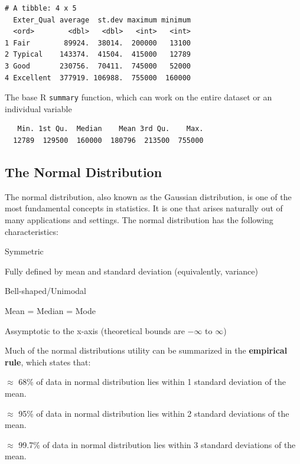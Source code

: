 \documentclass[
  letterpaper,
  DIV=11,
  numbers=noendperiod]{scrreprt}
\newenvironment{Shaded}{\begin{snugshade}}{\end{snugshade}}
\newcommand{\FunctionTok}[1]{\textcolor[rgb]{0.28,0.35,0.67}{#1}}
\newcommand{\NormalTok}[1]{\textcolor[rgb]{0.00,0.23,0.31}{#1}}
\newcommand{\SpecialCharTok}[1]{\textcolor[rgb]{0.37,0.37,0.37}{#1}}
\begin{document}
\begin{verbatim}
# A tibble: 4 x 5
  Exter_Qual average  st.dev maximum minimum
  <ord>        <dbl>   <dbl>   <int>   <int>
1 Fair        89924.  38014.  200000   13100
2 Typical    143374.  41504.  415000   12789
3 Good       230756.  70411.  745000   52000
4 Excellent  377919. 106988.  755000  160000
\end{verbatim}

The base R \texttt{summary} function, which can work on the entire
dataset or an individual variable

\begin{Shaded}
\end{Shaded}

\begin{verbatim}
   Min. 1st Qu.  Median    Mean 3rd Qu.    Max. 
  12789  129500  160000  180796  213500  755000 
\end{verbatim}

\hypertarget{normal}{%
\subsection{The Normal Distribution}\label{normal}}

The normal distribution, also known as the Gaussian distribution, is one
of the most fundamental concepts in statistics. It is one that arises
naturally out of many applications and settings. The normal distribution
has the following characteristics:

Symmetric

Fully defined by mean and standard deviation (equivalently, variance)

Bell-shaped/Unimodal

Mean = Median = Mode

Assymptotic to the x-axis (theoretical bounds are \(-\infty\) to
\(\infty\))

Much of the normal distributions utility can be summarized in the
\textbf{empirical rule}, which states that:

\(\approx\) 68\% of data in normal distribution lies within 1 standard
deviation of the mean.

\(\approx\) 95\% of data in normal distribution lies within 2 standard
deviations of the mean.

\(\approx\) 99.7\% of data in normal distribution lies within 3 standard
deviations of the mean.
\end{document}
